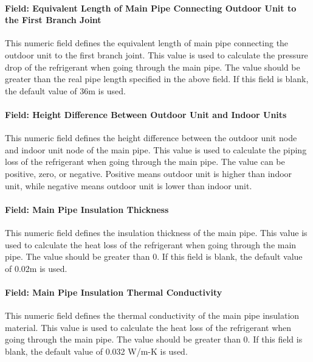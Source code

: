 \paragraph{Field: Equivalent Length of Main Pipe Connecting Outdoor Unit to the First Branch Joint}\label{field-equivalent-length-of-main-pipe-connecting-outdoor-unit-to-indoor-units}

This numeric field defines the equivalent length of main pipe connecting the outdoor unit to the first branch joint. This value is used to calculate the pressure drop of the refrigerant when going through the main pipe. The value should be greater than the real pipe length specified in the above field. If this field is blank, the default value of 36m is used.

\paragraph{Field: Height Difference Between Outdoor Unit and Indoor Units}\label{field-height-difference-between-outdoor-unit-and-indoor-units}

This numeric field defines the height difference between the outdoor unit node and indoor unit node of the main pipe. This value is used to calculate the piping loss of the refrigerant when going through the main pipe. The value can be positive, zero, or negative. Positive means outdoor unit is higher than indoor unit, while negative means outdoor unit is lower than indoor unit.

\paragraph{Field: Main Pipe Insulation Thickness}\label{field-main-pipe-insulation-thickness}

This numeric field defines the insulation thickness of the main pipe. This value is used to calculate the heat loss of the refrigerant when going through the main pipe. The value should be greater than 0. If this field is blank, the default value of 0.02m is used.

\paragraph{Field: Main Pipe Insulation Thermal Conductivity}\label{field-main-pipe-insulation-thermal-conductivity}

This numeric field defines the thermal conductivity of the main pipe insulation material. This value is used to calculate the heat loss of the refrigerant when going through the main pipe. The value should be greater than 0. If this field is blank, the default value of 0.032 W/m-K is used.

